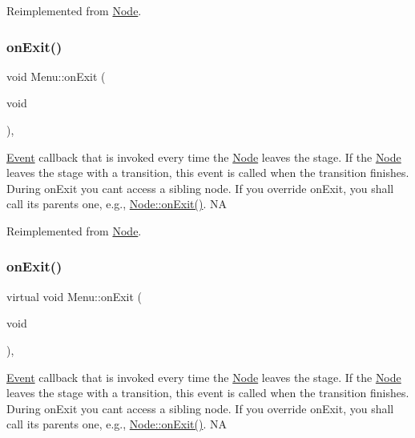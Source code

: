 Reimplemented from \hyperlink{classNode_a7f51764c4afd5018a052b9ef71c03374}{Node}.

\mbox{\label{classMenu_a247a5912b1bc6aacedcdb41324de391c}} 
\subsubsection{\texorpdfstring{on\+Exit()}{onExit()}\hspace{0.1cm}{\footnotesize\ttfamily [1/2]}}
{\footnotesize\ttfamily void Menu\+::on\+Exit (\begin{DoxyParamCaption}\item[{void}]{ }\end{DoxyParamCaption})\hspace{0.3cm}{\ttfamily [override]}, {\ttfamily [virtual]}}

\hyperlink{classEvent}{Event} callback that is invoked every time the \hyperlink{classNode}{Node} leaves the \textquotesingle{}stage\textquotesingle{}. If the \hyperlink{classNode}{Node} leaves the \textquotesingle{}stage\textquotesingle{} with a transition, this event is called when the transition finishes. During on\+Exit you can\textquotesingle{}t access a sibling node. If you override on\+Exit, you shall call its parent\textquotesingle{}s one, e.\+g., \hyperlink{classNode_ac83de835ea315e3179d4293acd8903ac}{Node\+::on\+Exit()}.  NA 

Reimplemented from \hyperlink{classNode_ac83de835ea315e3179d4293acd8903ac}{Node}.

\mbox{\label{classMenu_ac8aef4d0860df0ef9cb49382430bc72e}} 
\subsubsection{\texorpdfstring{on\+Exit()}{onExit()}\hspace{0.1cm}{\footnotesize\ttfamily [2/2]}}
{\footnotesize\ttfamily virtual void Menu\+::on\+Exit (\begin{DoxyParamCaption}\item[{void}]{ }\end{DoxyParamCaption})\hspace{0.3cm}{\ttfamily [override]}, {\ttfamily [virtual]}}

\hyperlink{classEvent}{Event} callback that is invoked every time the \hyperlink{classNode}{Node} leaves the \textquotesingle{}stage\textquotesingle{}. If the \hyperlink{classNode}{Node} leaves the \textquotesingle{}stage\textquotesingle{} with a transition, this event is called when the transition finishes. During on\+Exit you can\textquotesingle{}t access a sibling node. If you override on\+Exit, you shall call its parent\textquotesingle{}s one, e.\+g., \hyperlink{classNode_ac83de835ea315e3179d4293acd8903ac}{Node\+::on\+Exit()}.  NA 

